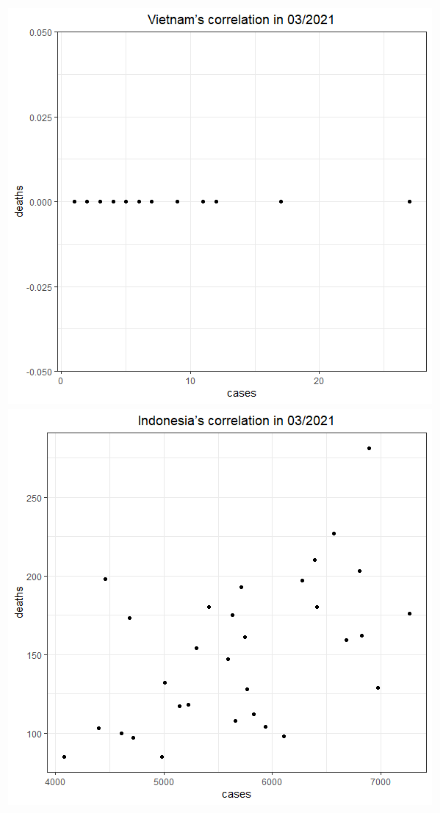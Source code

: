 \documentclass[english,10pt,table]{beamer}
\begin{document}
{\begin{figure}[H]
\begin{center}
        \includegraphics[scale = 0.2]{ix/ix.2/VN_03_2021.png}
        \includegraphics[scale = 0.2]{ix/ix.2/IDN_03_2021.png}

\end{center}
\end{figure}}
\end{document}
